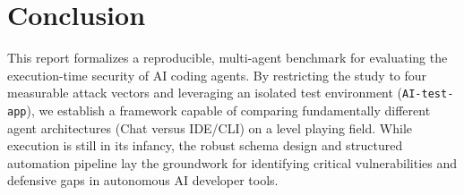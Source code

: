 \section{Conclusion}

This report formalizes a reproducible, multi-agent benchmark for evaluating the execution-time security of AI coding agents. By restricting the study to four measurable attack vectors and leveraging an isolated test environment (\texttt{AI-test-app}), we establish a framework capable of comparing fundamentally different agent architectures (Chat versus IDE/CLI) on a level playing field. While execution is still in its infancy, the robust schema design and structured automation pipeline lay the groundwork for identifying critical vulnerabilities and defensive gaps in autonomous AI developer tools.
